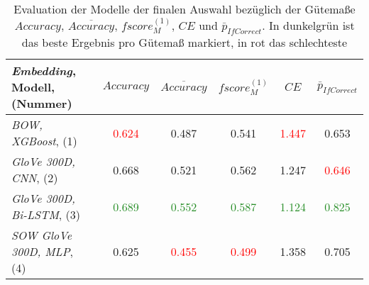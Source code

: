 \documentclass[a4paper,11pt]{article}
\begin{document}
\begin{table}[ht]
\centering
\begin{tabular}{|l||ccccc|}
  \hline
\textit{Embedding}, Modell, (Nummer) & $Accuracy$ & $\overline{Accuracy}$ & $fscore_M^{(1)}$ & $CE$ & $\bar{p}_{IfCorrect}$ \\ 
  \hline
\textit{BOW, XGBoost}, (1) & \textcolor{red}{0.624} & 0.487 & 0.541 & \textcolor{red}{1.447} & 0.653 \\ 
  \textit{GloVe 300D, CNN}, (2) & 0.668 & 0.521 & 0.562 & 1.247 & \textcolor{red}{0.646} \\ 
  \textit{GloVe 300D, Bi-LSTM}, (3) & \textcolor{ForestGreen}{0.689} & \textcolor{ForestGreen}{0.552} & \textcolor{ForestGreen}{0.587} & \textcolor{ForestGreen}{1.124} & \textcolor{ForestGreen}{0.825} \\ 
  \textit{SOW GloVe 300D, MLP}, (4) & 0.625 & \textcolor{red}{0.455} & \textcolor{red}{0.499} & 1.358 & 0.705 \\ 
   \hline
\end{tabular}
\caption{Evaluation der Modelle der finalen Auswahl bezüglich der Gütemaße $Accuracy$, $\overline{Accuracy}$, $fscore_M^{(1)}$, $CE$ und  $\bar{p}_{IfCorrect}$. In dunkelgrün ist das beste Ergebnis pro Gütemaß markiert, in rot das schlechteste}
\label{tab:finalSelection}

\end{table}
\end{document}

